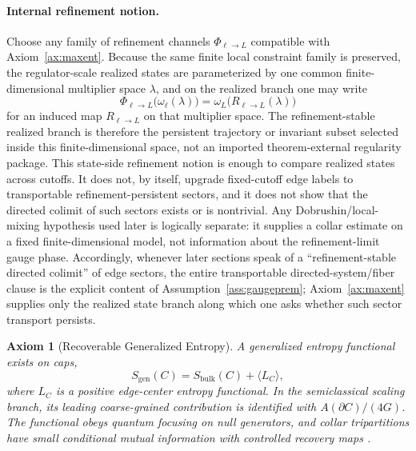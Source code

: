 \documentclass[11pt]{article}
\newtheorem{axiom}[theorem]{Axiom}
\begin{document}
\paragraph{Internal refinement notion.}
Choose any family of refinement channels \(\Phi_{\ell\to L}\) compatible with Axiom~\ref{ax:maxent}. Because the same finite local constraint family is preserved, the regulator-scale realized states are parameterized by one common finite-dimensional multiplier space \(\lambda\), and on the realized branch one may write
\[
\Phi_{\ell\to L}\bigl(\omega_{\ell}(\lambda)\bigr)
=
\omega_{L}\!\bigl(R_{\ell\to L}(\lambda)\bigr)
\]
for an induced map \(R_{\ell\to L}\) on that multiplier space. The refinement-stable realized branch is therefore the persistent trajectory or invariant subset selected inside this finite-dimensional space, not an imported theorem-external regularity package. This state-side refinement notion is enough to compare realized states across cutoffs. It does not, by itself, upgrade fixed-cutoff edge labels to transportable refinement-persistent sectors, and it does not show that the directed colimit of such sectors exists or is nontrivial. Any Dobrushin/local-mixing hypothesis used later is logically separate: it supplies a collar estimate on a fixed finite-dimensional model, not information about the refinement-limit gauge phase. Accordingly, whenever later sections speak of a ``refinement-stable directed colimit'' of edge sectors, the entire transportable directed-system/fiber clause is the explicit content of Assumption~\ref{ass:gaugeprem}; Axiom~\ref{ax:maxent} supplies only the realized state branch along which one asks whether such sector transport persists.

\begin{axiom}[Recoverable Generalized Entropy]\label{ax:entropy}
A generalized entropy functional exists on caps,
\[
S_{\mathrm{gen}}(C)=S_{\mathrm{bulk}}(C)+\langle L_C\rangle,
\]
where \(L_C\) is a positive edge-center entropy functional. In the semiclassical scaling branch, its leading coarse-grained contribution is identified with \(A(\partial C)/(4G)\). The functional obeys quantum focusing on null generators, and collar tripartitions have small conditional mutual information with controlled recovery maps \cite{liebRuskai73,petz86,petz88,fawziRenner15}.
\end{axiom}
\end{document}
